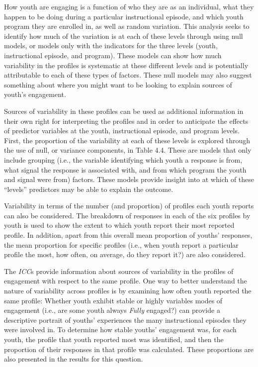 \documentclass[]{msu-thesis}
\theoremstyle{definition}
\theoremstyle{definition}
\theoremstyle{definition}
\theoremstyle{remark}
\begin{document}
How youth are engaging is a function of who they are as an individual,
what they happen to be doing during a particular instructional episode,
and which youth program they are enrolled in, as well as random
variation. This analysis seeks to identify how much of the variation is
at each of these levels through using null models, or models only with
the indicators for the three levels (youth, instructional episode, and
program). These models can show how much variability in the profiles is
systematic at these different levels and is potentially attributable to
each of these types of factors. These null models may also suggest
something about where you might want to be looking to explain sources of
youth's engagement.

Sources of variability in these profiles can be used as additional
information in their own right for interpreting the profiles and in
order to anticipate the effects of predictor variables at the youth,
instructional episode, and program levels. First, the proportion of the
variability at each of these levels is explored through the use of null,
or variance components, in Table 4.4. These are models that only include
grouping (i.e., the variable identifying which youth a response is from,
what signal the response is associated with, and from which program the
youth and signal were from) factors. These models provide insight into
at which of these ``levels'' predictors may be able to explain the
outcome.

Variability in terms of the number (and proportion) of profiles each
youth reports can also be considered. The breakdown of responses in each
of the six profiles by youth is used to show the extent to which youth
report their most reported profile. In addition, apart from this overall
mean proportion of youths' responses, the mean proportion for specific
profiles (i.e., when youth report a particular profile the most, how
often, on average, do they report it?) are also considered.

The \emph{ICC}s provide information about sources of variability in the
profiles of engagement with respect to the same profile. One way to
better understand the nature of variability across profiles is by
examining how often youth reported the same profile: Whether youth
exhibit stable or highly variables modes of engagement (i.e., are some
youth always \emph{Fully} engaged?) can provide a descriptive portrait
of youths' experiences the many instructional episodes they were
involved in. To determine how stable youths' engagement was, for each
youth, the profile that youth reported most was identified, and then the
proportion of their responses in that profile was calculated. These
proportions are also presented in the results for this question.
\end{document}
